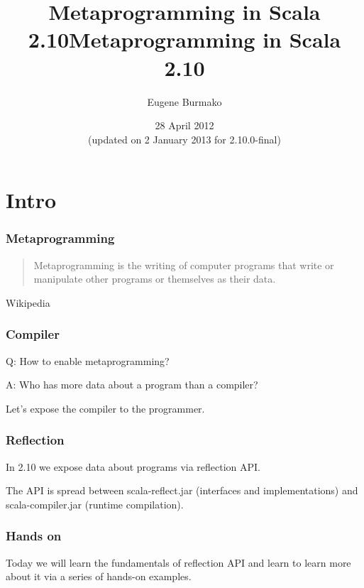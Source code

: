 \documentclass[hyperref={bookmarks=false}]{beamer}
\title{Metaprogramming in Scala 2.10}
\begin{document}
\title{Metaprogramming in Scala 2.10}
\author{Eugene Burmako}
\date{28 April 2012 \\ (updated on 2 January 2013 for 2.10.0-final)}
\maketitle

\section{Intro}

\begin{frame}[fragile]
\frametitle{Metaprogramming}

\begin{quote}
Metaprogramming is the writing of computer programs that write or manipulate other programs or themselves as their data.
\end{quote}

\begin{flushright}
\textemdash Wikipedia
\end{flushright}

\end{frame}

\begin{frame}[fragile]
\frametitle{Compiler}

Q: How to enable metaprogramming?

A: Who has more data about a program than a compiler?

Let's expose the compiler to the programmer.

\end{frame}

\begin{frame}[fragile]
\frametitle{Reflection}

In 2.10 we expose data about programs via reflection API.

The API is spread between scala-reflect.jar (interfaces and implementations) and scala-compiler.jar (runtime compilation).

\end{frame}

\begin{frame}[fragile]
\frametitle{Hands on}

Today we will learn the fundamentals of reflection API and learn to learn more about it
via a series of hands-on examples.

\end{frame}
\end{document}
